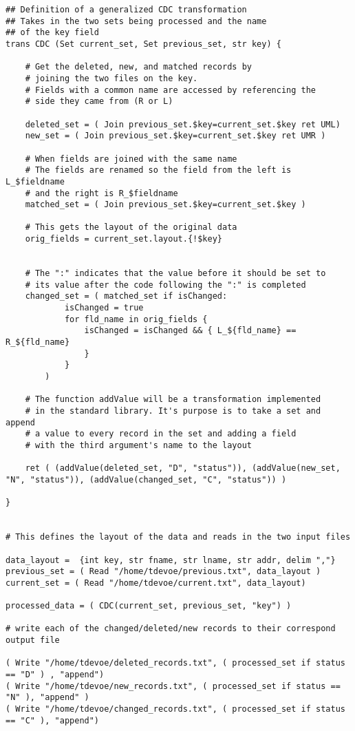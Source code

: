 \documentclass{article}
\begin{document}
\begin{lstlisting}[title=General Case]
## Definition of a generalized CDC transformation
## Takes in the two sets being processed and the name
## of the key field
trans CDC (Set current_set, Set previous_set, str key) {

	# Get the deleted, new, and matched records by 
	# joining the two files on the key. 
	# Fields with a common name are accessed by referencing the
	# side they came from (R or L)

	deleted_set = ( Join previous_set.$key=current_set.$key ret UML)
	new_set = ( Join previous_set.$key=current_set.$key ret UMR )
	
	# When fields are joined with the same name
	# The fields are renamed so the field from the left is L_$fieldname
	# and the right is R_$fieldname
	matched_set = ( Join previous_set.$key=current_set.$key )

	# This gets the layout of the original data
	orig_fields = current_set.layout.{!$key}

	
	# The ":" indicates that the value before it should be set to
	# its value after the code following the ":" is completed
	changed_set = ( matched_set if isChanged: 
			isChanged = true
			for fld_name in orig_fields { 
				isChanged = isChanged && { L_${fld_name} == R_${fld_name} 
				} 
			}
		)

	# The function addValue will be a transformation implemented
	# in the standard library. It's purpose is to take a set and append
	# a value to every record in the set and adding a field
	# with the third argument's name to the layout

	ret ( (addValue(deleted_set, "D", "status")), (addValue(new_set, "N", "status")), (addValue(changed_set, "C", "status")) )

}


# This defines the layout of the data and reads in the two input files

data_layout =  {int key, str fname, str lname, str addr, delim ","}
previous_set = ( Read "/home/tdevoe/previous.txt", data_layout )
current_set = ( Read "/home/tdevoe/current.txt", data_layout)

processed_data = ( CDC(current_set, previous_set, "key") )

# write each of the changed/deleted/new records to their correspond output file

( Write "/home/tdevoe/deleted_records.txt", ( processed_set if status == "D" ) , "append")
( Write "/home/tdevoe/new_records.txt", ( processed_set if status == "N" ), "append" )
( Write "/home/tdevoe/changed_records.txt", ( processed_set if status == "C" ), "append")
\end{lstlisting}
\end{document}
